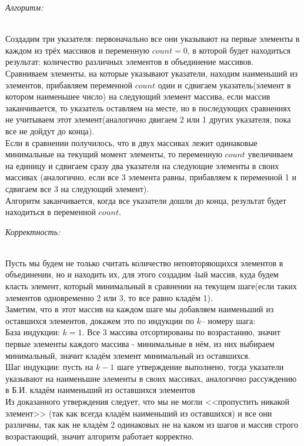 \documentclass[a4paper,12pt]{article} %
\begin{document}
\begin{large}
\hspace{0.1cm} \textit{Алгоритм:}
\end{large}\\
Создадим три указателя: первоначально все они указывают на первые элементы в каждом из трёх массивов и переменную $ count = 0$, в которой будет находиться результат: количество различных элементов в объединение массивов.\\
Сравниваем элементы, на которые указывают указатели, находим наименьший из элементов, прибавляем переменной $ count $ один и сдвигаем указатель(элемент в котором наименьшее число) на следующий элемент массива, если массив заканчивается, то указатель оставляем на месте, но в последующих сравнениях не учитываем этот элемент(аналогично двигаем 2 или 1 других указателя, пока все не дойдут до конца).\\
Если в сравнении получилось, что в двух массивах лежит одинаковые минимальные на текущий момент элементы, то переменную $ count $ увеличиваем на единицу и сдвигаем сразу два указателя на следующие элементы в своих массивах (аналогично, если все 3 элемента равны, прибавляем к переменной 1 и сдвигаем все 3 на следующий элемент). \\
Алгоритм заканчивается, когда все указатели дошли до конца, результат будет находиться в переменной $ count $.\\

\begin{large}
\textit{Корректность:}
\end{large}\\
Пусть мы будем не только считать количество неповторяющихся элементов в объединении, но и находить их, для этого создадим 4ый массив, куда будем класть элемент, который минимальный в сравнении на текущем шаге(если таких элементов одновременно 2 или 3, то все равно кладём 1).\\
Заметим, что в этот массив на каждом шаге мы добавляем наименьший из оставшихся элементов, докажем это по индукции по $ k $-- номеру шага:\\
База индукции: $ k = 1$. Все 3 массива отсортированы по возрастанию, значит первые элементы каждого массива - минимальные в нём, из них выбираем минимальный, значит кладём элемент минимальный из оставшихся.\\
Шаг индукции: пусть на $ k-1 $ шаге утверждение выполнено, тогда указатели указывают на наименьшие элементы в своих массивах, аналогично рассуждению в Б.И. кладём наименьший из оставшихся элементов\\
Из доказанного утверждения следует, что мы не могли <<пропустить никакой элемент>> (так как всегда кладём наименьший из оставшихся) и все они различны, так как не кладём 2 одинаковых не на каком из шагов и массив строго возрастающий, значит алгоритм работает корректно.\\
\end{document}
